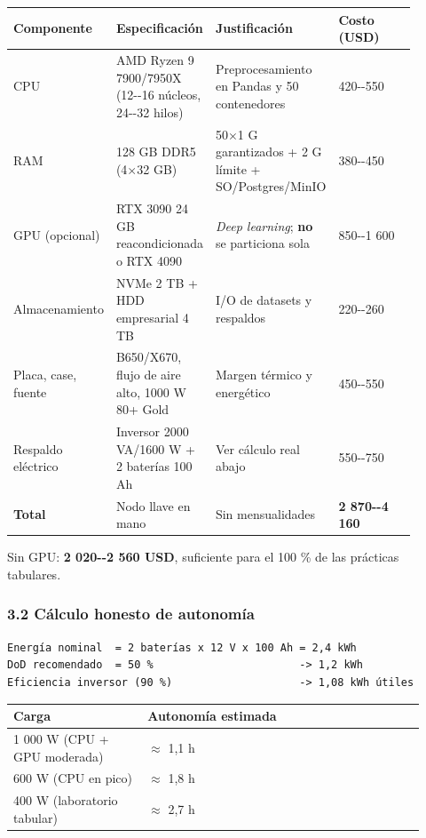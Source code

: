 \documentclass[11pt,a4paper]{article}
\begin{document}
\begin{longtable}[]{@{}p{0.225\linewidth}p{0.225\linewidth}p{0.225\linewidth}p{0.225\linewidth}@{}}
\toprule
Componente & Especificación & Justificación & Costo (USD) \\
\midrule
\endhead
CPU & AMD Ryzen 9 7900/7950X (12-\/-16 núcleos, 24-\/-32 hilos) & Preprocesamiento en Pandas y 50 contenedores & 420-\/-550 \\
RAM & 128 GB DDR5 (4\(\times\)32 GB) & 50\(\times\)1 G garantizados + 2 G límite + SO/Postgres/MinIO & 380-\/-450 \\
GPU (opcional) & RTX 3090 24 GB reacondicionada o RTX 4090 & \emph{Deep learning}; \textbf{no} se particiona sola & 850-\/-1 600 \\
Almacenamiento & NVMe 2 TB + HDD empresarial 4 TB & I/O de datasets y respaldos & 220-\/-260 \\
Placa, case, fuente & B650/X670, flujo de aire alto, 1000 W 80+ Gold & Margen térmico y energético & 450-\/-550 \\
Respaldo eléctrico & Inversor 2000 VA/1600 W + 2 baterías 100 Ah & Ver cálculo real abajo & 550-\/-750 \\
\textbf{Total} & Nodo llave en mano & Sin mensualidades & \textbf{2 870-\/-4 160} \\
\bottomrule
\end{longtable}

Sin GPU: \textbf{2 020-\/-2 560 USD}, suficiente para el 100 \% de las prácticas tabulares.

\hypertarget{32-cuxe1lculo-honesto-de-autonomuxeda}{%
\subsubsection{3.2 Cálculo honesto de autonomía}\label{32-cuxe1lculo-honesto-de-autonomuxeda}}

\begin{lstlisting}
Energía nominal  = 2 baterías x 12 V x 100 Ah = 2,4 kWh
DoD recomendado  = 50 %                       -> 1,2 kWh
Eficiencia inversor (90 %)                    -> 1,08 kWh útiles
\end{lstlisting}

\begin{longtable}[]{@{}p{0.300\linewidth}p{0.620\linewidth}@{}}
\toprule
Carga & Autonomía estimada \\
\midrule
\endhead
1 000 W (CPU + GPU moderada) & \(\approx\) 1,1 h \\
600 W (CPU en pico) & \(\approx\) 1,8 h \\
400 W (laboratorio tabular) & \(\approx\) 2,7 h \\
\bottomrule
\end{longtable}
\end{document}
